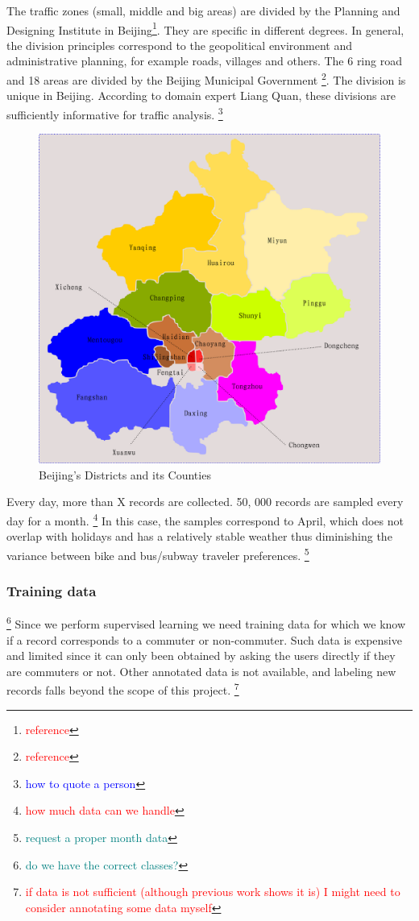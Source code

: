 \documentclass{article}
\newcommand{\selfnote}[1]{\footnote{\textcolor{red}{#1}}}
\newcommand{\domainDoubt}[1]{\footnote{\textcolor{teal}{#1}}}
\newcommand{\technicalDoubt}[1]{\footnote{\textcolor{blue}{#1}}}
\begin{document}
The traffic zones (small, middle and big areas) are divided by the Planning and Designing Institute in Beijing\selfnote{reference}. They are specific in different degrees. In general, the division principles correspond to the geopolitical environment and administrative planning, for example roads, villages and others. The 6 ring road and 18 areas are divided by the Beijing Municipal Government \selfnote{reference}. The division is unique in Beijing. According to domain expert Liang Quan, these divisions are sufficiently informative for traffic analysis. \technicalDoubt{how to quote a person}

\begin{figure}
  \centering
  \includegraphics[width=.8\linewidth]{./images/beijing_18areas.png}
  \caption{Beijing's Districts and its Counties}
  \label{fig:data/18areas}
\end{figure}

Every day, more than X records are collected. 50, 000 records are sampled every day for a month. \selfnote{how much data can we handle} In this case, the samples correspond to April, which does not overlap with holidays and has a relatively stable weather thus diminishing the variance between bike and bus/subway traveler preferences. \domainDoubt{request a proper month data}

\subsubsection{Training data} \domainDoubt{do we have the correct classes?}
Since we perform supervised learning we need training data for which we know if a record corresponds to a commuter or non-commuter. Such data is expensive and limited since it can  only been obtained by asking the users directly if they are commuters or not. Other annotated data is not available, and labeling new records falls beyond the scope of this project. \selfnote{if data is not sufficient (although previous work shows it is) I might need to consider annotating some data myself}
\end{document}
